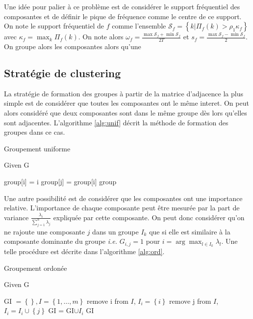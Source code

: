 \documentclass{gretsi}
\newcommand{\set}[1]{\left \{ 1, \dots, #1 \right \}}
\begin{document}
    Une idée pour palier à ce problème est de considérer le support fréquentiel des composantes et de définir le pique de fréquence comme le centre de ce support. On note le support fréquentiel de $f$ comme l'ensemble $\mathcal S_f = \left \{ k | \Pi_f(k) > \rho_1 \kappa_f \right \}$ avec $\kappa_f = \max_k \Pi_f(k)$. On note alors $\omega_f = \frac{\max \mathcal S_f + \min \mathcal S_f }{2 T}$ et $s_f = \frac{\max \mathcal S_f - \min \mathcal S_f }{2}$. On groupe alors les composantes  alors qu'une 



\subsection{Stratégie de clustering}
\label{sub:clust}

La stratégie de formation des groupes à partir de la matrice d'adjacence la plus simple est de considérer que toutes les composantes ont le même interet. On peut alors considéré que deux composantes sont dans le même groupe dès lors qu'elles sont adjacentes. L'algorithme \ref{alg:unif} décrit la méthode de formation des groupes dans ce cas.\\

\begin{algorithm}
\caption{Groupement uniforme}\label{alg:unif}
Given G
\begin{algorithmic}[1]
\State group[i] = i
\EndFor
{}
 group[j] = group[i]
\EndIf
\EndFor
\EndFor
\State \Return group
\end{algorithmic}
\end{algorithm}

Une autre possibilité est de considérer que les composantes ont une importance relative. L'importance de chaque composante peut être mesurée par la part de variance $\frac{\lambda_i}{\sum_{j=1}^n \lambda_j}$ expliquée par cette composante. On peut donc considérer qu'on ne rajoute une composante $j$ dans un groupe $I_k$ que si elle est similaire à la composante dominante du groupe \emph{ i.e. } $G_{i, j} = 1$ pour $i = \arg\max_{l \in I_k} \lambda_l$. Une telle procédure est décrite dans l'algorithme \ref{alg:ord}.

\begin{algorithm}
\caption{Groupement ordonée}\label{alg:ord}
Given G
\begin{algorithmic}[1]
\State GI $= \left \{  \right \}, I = \set{m}$
\State remove i from $I$, $I_i = \left \{ i \right \}$
\State remove j from $I$, $I_i = I_i \cup \left \{ j \right \}$
\EndIf
\EndFor
\State GI = GI$ \cup I_i$
\EndFor
\State \Return GI
\end{algorithmic}
\end{algorithm}
\end{document}
